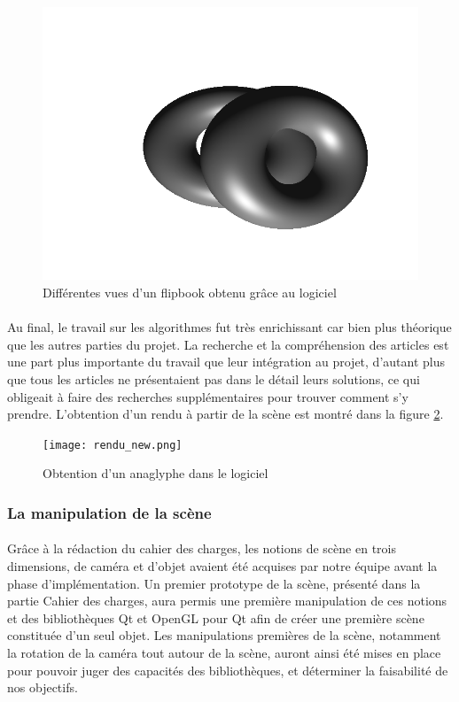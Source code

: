 \begin{figure}[H]
        \includegraphics[scale=0.3]{testGif8.png}
	\caption{\label{fig:flipbook_logiciel} Différentes vues d'un flipbook obtenu grâce au logiciel \protect}
\end{figure}

\paragraph{}
Au final, le travail sur les algorithmes fut très enrichissant car bien plus théorique que les autres parties du projet. La recherche et la compréhension des articles est une part plus importante du travail que leur intégration au projet, d'autant plus que tous les articles ne présentaient pas dans le détail leurs solutions, ce qui obligeait à faire des recherches supplémentaires pour trouver comment s'y prendre. L'obtention d'un rendu à partir de la scène est montré dans la figure \ref{fig:screenRendu}.

\begin{figure}[h]
	\centering
	\texttt{[image: rendu\_new.png]}
	\caption{\label{fig:screenRendu} Obtention d'un anaglyphe dans le logiciel \protect}
\end{figure}

\subsubsection{La manipulation de la scène}
\paragraph{}
Grâce à la rédaction du cahier des charges, les notions de scène en trois dimensions, de caméra et d'objet avaient été acquises par notre équipe avant la phase d'implémentation. Un premier prototype de la scène, présenté dans la partie Cahier des charges, aura permis une première manipulation de ces notions et des bibliothèques Qt et OpenGL pour Qt afin de créer une première scène constituée d'un seul objet. Les manipulations premières de la scène, notamment la rotation de la caméra tout autour de la scène, auront ainsi été mises en place pour pouvoir juger des capacités des bibliothèques, et déterminer la faisabilité de nos objectifs.

